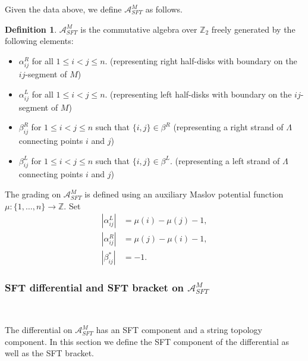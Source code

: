 \documentclass[a4paper,final, reqno]{amsart}
\theoremstyle{plain}
\theoremstyle{definition}
\newtheorem{Def}[Th]{Definition}
\newcommand{\A}{\mathcal{A}}
\begin{document}
	Given the data above, we define $\A^M_{SFT}$ as follows.
	
	\begin{Def}
		
		$\A^M_{SFT}$ is the commutative algebra over $\mathbb{Z}_2$ freely generated by the following elements:
		
		\begin{itemize}
			\item $\alpha_{ij}^R$ for all $1\leq i<j \leq n$. (representing right half-disks with boundary on the $ij$-segment of $M$)
			\item $\alpha_{ij}^L$ for all $1\leq i<j \leq n$. (representing left half-disks with boundary on the $ij$-segment of $M$)
			\item $\beta_{ij}^R$ for $1\leq i<j \leq n$ such that $\{i,j\} \in \beta^R$ (representing a right strand of $\Lambda$ connecting points $i$ and $j$)
			\item $\beta_{ij}^L$ for $1\leq i<j \leq n$ such that $\{i,j\} \in \beta^L$. (representing a left strand of $\Lambda$ connecting points $i$ and $j$) 
		\end{itemize}
		
	\end{Def}
	
	
	
	
	
	
	The grading on $\A^M_{SFT}$ is defined using an auxiliary Maslov potential function $\mu: \{1,\dots, n\} \to \mathbb{Z}$. Set 
	\begin{align*}
		|\alpha_{ij}^L| &= \mu(i)-\mu(j)-1,\\
		|\alpha_{ij}^R| &= \mu(j)-\mu(i)-1,\\
		|\beta_{ij}^*| &= -1.
	\end{align*}
	
	
	\subsubsection{SFT differential and SFT bracket on $\A_{SFT}^M$}
	
	\-\
	
	The differential on $\A^M_{SFT}$ has an SFT component and a string topology component. In this section we define the SFT component of the differential as well as the SFT bracket.
	
\end{document}

